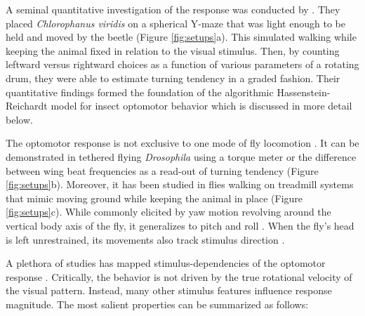 A seminal quantitative investigation of the response was conducted by \citet{Hassenstein:1956fa}. They placed \textit{Chlorophanus viridis} on a spherical Y-maze that was light enough to be held and moved by the beetle (Figure \ref{fig:setups}a). This simulated walking while keeping the animal fixed in relation to the visual stimulus. Then, by counting leftward versus rightward choices as a function of various parameters of a rotating drum, they were able to estimate turning tendency in a graded fashion. Their quantitative findings formed the foundation of the algorithmic Hassenstein-Reichardt model for insect optomotor behavior \citep{Reichardt:1961aa} which is discussed in more detail below.

The optomotor response is not exclusive to one mode of fly locomotion \citep{Fermi:1963aa,Gotz:1964bj,Goetz:1973aa,Buchner:1976kd,Goetz:1987aa}. It can be demonstrated in tethered flying \textit{Drosophila} using a torque meter or the difference between wing beat frequencies as a read-out of turning tendency (Figure \ref{fig:setups}b). Moreover, it has been studied in flies walking on treadmill systems that mimic moving ground while keeping the animal in place (Figure \ref{fig:setups}c). While commonly elicited by yaw motion revolving around the vertical body axis of the fly, it generalizes to pitch and roll \citep{Blondeau:1982hd}. When the fly's head is left unrestrained, its movements also track stimulus direction \citep{Hengstenberg:1988kg}.

A plethora of studies has mapped stimulus-dependencies of the optomotor response \citep[see][]{Borst:2010fk}. Critically, the behavior is not driven by the true rotational velocity of the visual pattern. Instead, many other stimulus features influence response magnitude. The most salient properties can be summarized as follows:

